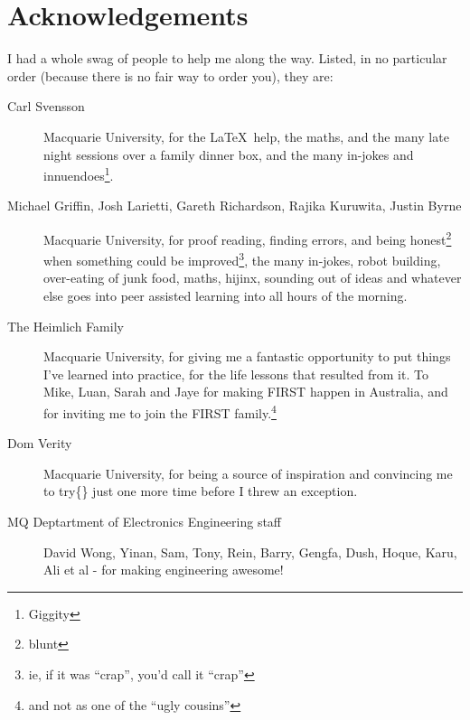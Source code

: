 \chapter{Acknowledgements}
\label{chap:Acknowledgements}
I had a whole swag of people to help me along the way. Listed, in no particular
order (because there is no fair way to order you), they are:
\begin{description}
  \item[Carl Svensson] Macquarie University, for the \LaTeX~help, the maths, and
  the many late night sessions over a family dinner box, and the many in-jokes
  and innuendoes\footnote{Giggity}.
  
  \item[Michael Griffin, Josh Larietti, Gareth Richardson, Rajika Kuruwita,
  Justin Byrne] Macquarie University, for proof reading, finding errors, and
  being honest\footnote{blunt} when something could be improved\footnote{ie,
  if it was ``crap'', you'd call it ``crap''}, the many in-jokes, robot
  building, over-eating of junk food, maths, hijinx, sounding out of ideas and
  whatever else goes into peer assisted learning into all hours of the morning.
  
  \item[The Heimlich Family] Macquarie University, for giving me a fantastic
  opportunity to put things I've learned into practice, for the life lessons
  that resulted from it. To Mike, Luan, Sarah and Jaye for making FIRST happen
  in Australia, and for inviting me to join the FIRST family.\footnote{and not
  as one of the ``ugly cousins''}
  
  \item[Dom Verity] Macquarie University, for being a source of inspiration and
  convincing me to try\{\} just one more time before I threw an exception.
  
  \item[MQ Deptartment of Electronics Engineering staff] David Wong, Yinan,
  Sam, Tony, Rein, Barry, Gengfa, Dush, Hoque, Karu, Ali et al - for making
  engineering awesome!
  
  

\end{description}
